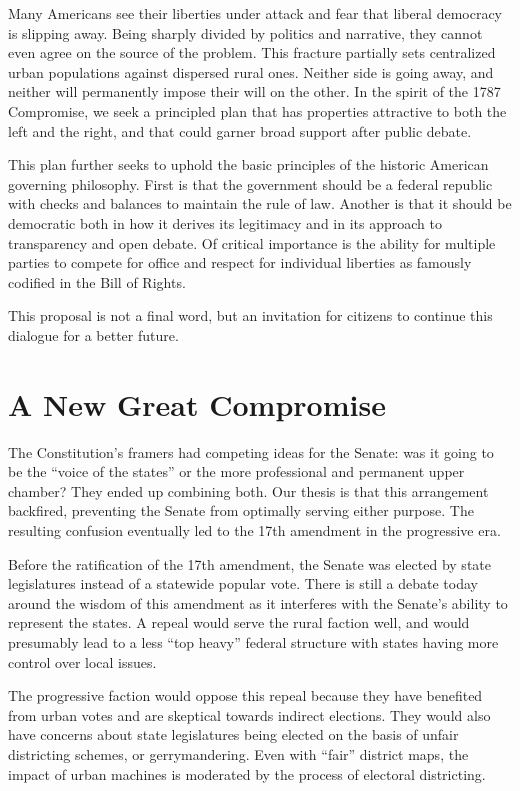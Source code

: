 \documentclass{article}
\newcommand{\quotes}[1]{``#1''}
\begin{document}
Many Americans see their liberties under attack and fear that liberal democracy is slipping away. Being sharply divided by politics and narrative, they cannot even agree on the source of the problem. This fracture partially sets centralized urban populations against dispersed rural ones. Neither side is going away, and neither will permanently impose their will on the other. In the spirit of the 1787 Compromise, we seek a principled plan that has properties attractive to both the left and the right, and that could garner broad support after public debate.

This plan further seeks to uphold the basic principles of the historic American governing philosophy. First is that the government should be a federal republic with checks and balances to maintain the rule of law. Another is that it should be democratic both in how it derives its legitimacy and in its approach to transparency and open debate. Of critical importance is the ability for multiple parties to compete for office and respect for individual liberties as famously codified in the Bill of Rights.

This proposal is not a final word, but an invitation for citizens to continue this dialogue for a better future.

\section{A New Great Compromise}

The Constitution's framers had competing ideas for the Senate: was it going to be the \quotes{voice of the states} or the more professional and permanent upper chamber? They ended up combining both. Our thesis is that this arrangement backfired, preventing the Senate from optimally serving either purpose. The resulting confusion eventually led to the 17th amendment in the progressive era.

Before the ratification of the 17th amendment, the Senate was elected by state legislatures instead of a statewide popular vote. There is still a debate today around the wisdom of this amendment as it interferes with the Senate's ability to represent the states\cite{Tucker}. A repeal would serve the rural faction well\cite{Virginia}, and would presumably lead to a less \quotes{top heavy} federal structure with states having more control over local issues.

The progressive faction would oppose this repeal because they have benefited from urban votes and are skeptical towards indirect elections\cite{Smith}. They would also have concerns about state legislatures being elected on the basis of unfair districting schemes, or gerrymandering. Even with \quotes{fair} district maps, the impact of urban machines is moderated by the process of electoral districting.
\end{document}

